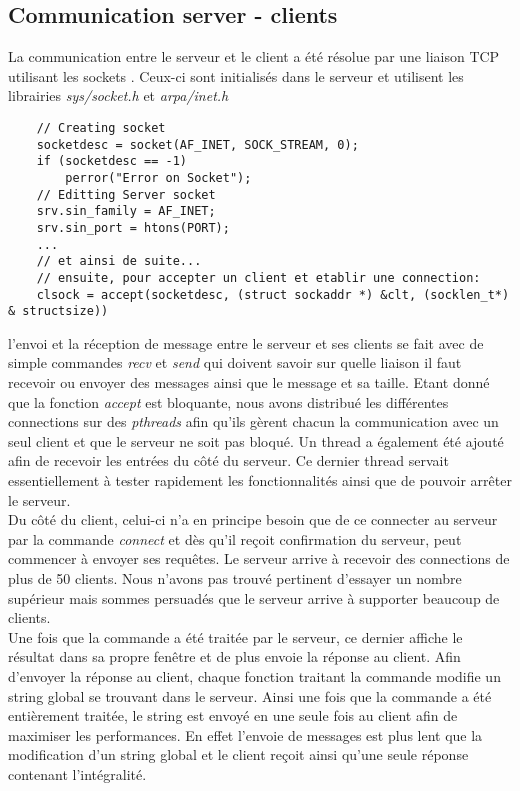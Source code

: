 \documentclass[11pt,a4paper]{article}
\begin{document}
\subsection{Communication server - clients}
La communication entre le serveur et le client a été résolue par une liaison TCP utilisant les sockets \cite{TCP}. Ceux-ci sont initialisés dans le serveur et utilisent les librairies \textit{sys/socket.h} et \textit{arpa/inet.h}
\begin{lstlisting}
	// Creating socket
	socketdesc = socket(AF_INET, SOCK_STREAM, 0);
    if (socketdesc == -1)
        perror("Error on Socket");
    // Editting Server socket
    srv.sin_family = AF_INET;
    srv.sin_port = htons(PORT);
    ...
    // et ainsi de suite...
    // ensuite, pour accepter un client et etablir une connection:
    clsock = accept(socketdesc, (struct sockaddr *) &clt, (socklen_t*) & structsize))
\end{lstlisting}
l'envoi et la réception de message entre le serveur et ses clients se fait avec de simple commandes \textit{recv} et \textit{send} qui doivent savoir sur quelle liaison il faut recevoir ou envoyer des messages ainsi que le message et sa taille. Etant donné que la fonction \textit{accept} est bloquante, nous avons distribué les différentes connections sur des \textit{pthreads} afin qu'ils gèrent chacun la communication avec un seul client et que le serveur ne soit pas bloqué. Un thread a également été ajouté afin de recevoir les entrées du côté du serveur. Ce dernier thread servait essentiellement à tester rapidement les fonctionnalités ainsi que de pouvoir arrêter le serveur.\\
Du côté du client, celui-ci n'a en principe besoin que de ce connecter au serveur par la commande \textit{connect} et dès qu'il reçoit confirmation du serveur, peut commencer à envoyer ses requêtes. Le serveur arrive à recevoir des connections de plus de 50 clients. Nous n'avons pas trouvé pertinent d'essayer un nombre supérieur mais sommes persuadés que le serveur arrive à supporter beaucoup de clients.\\
Une fois que la commande a été traitée par le serveur, ce dernier affiche le résultat dans sa propre fenêtre et de plus envoie la réponse au client. Afin d'envoyer la réponse au client, chaque fonction traitant la commande modifie un string global se trouvant dans le serveur. Ainsi une fois que la commande a été entièrement traitée, le string est envoyé en une seule fois au client afin de maximiser les performances. En effet l'envoie de messages est plus lent que la modification d'un string global et le client reçoit ainsi qu'une seule réponse contenant l'intégralité.
\end{document}
